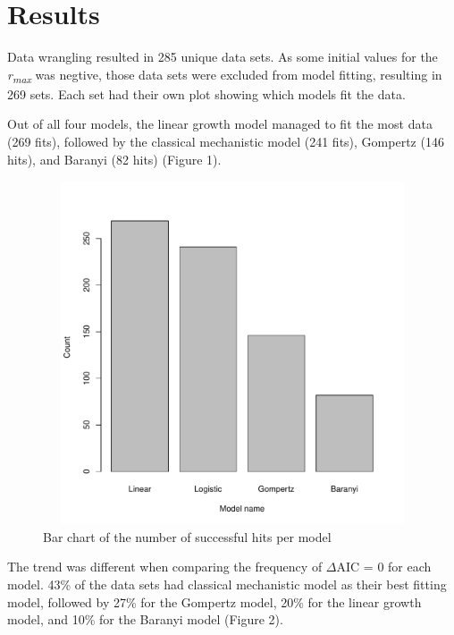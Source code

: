 \documentclass[11pt]{article}
\begin{document}
\section{Results}
Data wrangling resulted in 285 unique data sets. As some initial values for the \emph{r\textsubscript{max}} was negtive, those data sets were excluded from model fitting, resulting in 269 sets. Each set had their own plot showing which models fit the data. 

Out of all four models, the linear growth model managed to fit the most data (269 fits), followed by the classical mechanistic model (241 fits), Gompertz (146 hits), and Baranyi (82 hits) (Figure 1).

\begin{figure}[H]
\includegraphics[keepaspectratio, width = 5in, height = 4in]{../results/numfit.pdf}
\centering
\caption{Bar chart of the number of successful hits per model}
\end{figure}
\newpage
The trend was different when comparing the frequency of {$\Delta$AIC} = 0 for each model. 43\% of the data sets had classical mechanistic model as their best fitting model, followed by 27\% for the Gompertz model, 20\% for the linear growth model, and 10\% for the Baranyi model (Figure 2).
\end{document}
